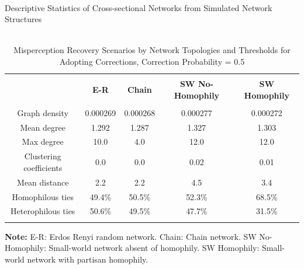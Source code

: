 \documentclass[man, 12pt, a4paper, nolmodern, noextraspace]{apa6}
\begin{document}
\begin{table}[!htbp] \centering 
  \begin{minipage}{\textwidth}
    \centering
  \caption{\\ Descriptive Statistics of Cross-sectional Networks from Simulated Network Structures} 
  \label{tab:Table1} 
\begin{tabular}{@{\extracolsep{5pt}} ccccc} 
\\[-1.8ex]\hline 
\hline \\[-1.8ex] 
 & \textbf{E-R} & \textbf{Chain} &  \textbf{SW No-Homophily} & \textbf{SW Homophily} \\ 
\hline \\[-1.8ex] 
Graph density & 0.000269 & 0.000268 & 0.000277 & 0.000272 \\ 
Mean degree & 1.292 & 1.287 & 1.327 & 1.303 \\ 
Max degree & 10.0 & 4.0 & 12.0 & 12.0 \\ 
Clustering coefficients & 0.0 & 0.0 & 0.02 & 0.01 \\ 
Mean distance & 2.2 & 2.2 & 4.5 & 3.4 \\ 
Homophilous ties & 49.4\% & 50.5\% & 52.3\% & 68.5\% \\ 
Heterophilous ties & 50.6\% & 49.5\% & 47.7\% & 31.5\% \\ 
\hline \\[-1.8ex]  
\end{tabular} 
\begin{tablenotes}
\small \vspace{0.15in}
\textbf{Note:} E-R: Erdos Renyi random network. Chain: Chain network. SW No-Homophily: Small-world network absent of homophily. SW Homophily: Small-world network with partisan homophily.\\ 
\end{tablenotes}
  \end{minipage}
\bigbreak
\vspace{0.5in}
  \begin{minipage}{\textwidth}
    \centering
\caption{\\ Misperception Recovery Scenarios by Network Topologies and Thresholds for Adopting Corrections, Correction Probability = 0.5} 
  \label{tab:Table2} 
  

\end{minipage}
\end{table}
\end{document}
